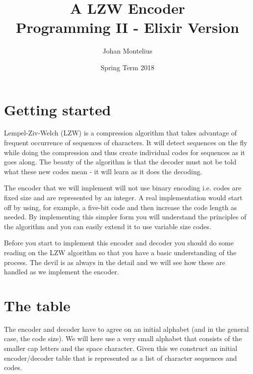 \documentclass[a4paper,11pt]{article}
\begin{document}

\title{
    \textbf{A LZW Encoder}\\
    \large{Programming II - Elixir Version}
}
\author{Johan Montelius}
\date{Spring Term 2018}
\maketitle
\thispagestyle{fancy}



\section*{Getting started}

Lempel-Ziv-Welch (LZW) is a compression algorithm that takes advantage
of frequent occurrence of sequences of characters. It will detect
sequences on the fly while doing the compression and thus create
individual codes for sequences as it goes along. The beauty of the
algorithm is that the decoder must not be told what these new codes
mean - it will learn as it does the decoding.

The encoder that we will implement will not use binary encoding
i.e. codes are fixed size and are represented by an integer. A real
implementation would start off by using, for example, a five-bit code
and then increase the code length as needed. By implementing this
simpler form you will understand the principles of the algorithm and
you can easily extend it to use variable size codes.

Before you start to implement this encoder and decoder you should do
some reading on the LZW algorithm so that you have a basic
understanding of the process. The devil is as always in the detail and
we will see how these are handled as we implement the encoder.



\section{The table}

The encoder and decoder have to agree on an initial alphabet (and in
the general case, the code size). We will here use a very small
alphabet that consists of the smaller cap letters and the space
character. Given this we construct an initial encoder/decoder table
that is represented as a list of character sequences and codes.
\end{document}

